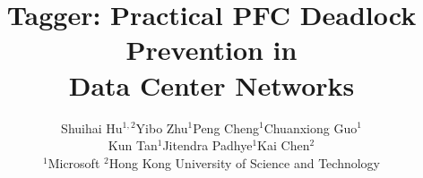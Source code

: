\documentclass[10pt, sigconf, printonly]{acmart}
\newcommand{\sysname}{Tagger}
\begin{document}
	\title{\sysname{}: Practical PFC Deadlock Prevention in\\Data Center Networks}
	\author{Shuihai Hu$^{1,2}$\hspace{3mm}Yibo Zhu$^{1}$\hspace{3mm}Peng Cheng$^{1}$\hspace{3mm}Chuanxiong Guo$^{1}$\\Kun Tan$^{1}$\hspace{3mm}Jitendra Padhye$^{1}$\hspace{3mm}Kai Chen$^{2}$\\ 
		$^{1}$Microsoft \hspace{3mm}$^{2}$Hong Kong University of Science and Technology}


	\maketitle
	
	
	
	
	
	
	
	
	
	
	
	
%	
	
	
	
	
\end{document}
